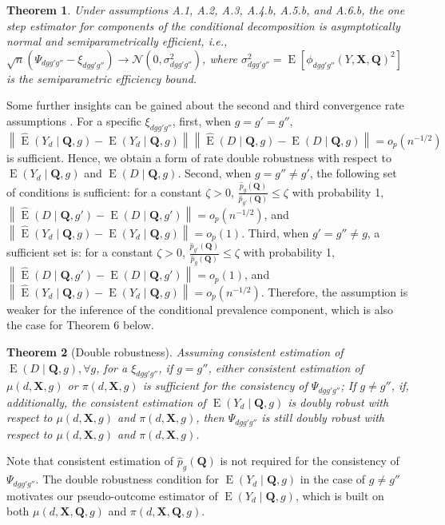 \documentclass[12pt,a4paper]{article}
\newtheorem{prop}{Theorem}
\newcommand{\E}{\operatorname{E}}
\def\X{{\boldsymbol X}}
\def\Q{{\boldsymbol Q}}
\begin{document}
\begin{prop}
Under assumptions A.1, A.2, A.3, A.4.b, A.5.b, and A.6.b, the one step estimator for components of the conditional decomposition is asymptotically normal and semiparametrically efficient, i.e., $\sqrt{n} \left( \Psi_{dgg'g''} - \xi_{dgg'g''} \right) \xrightarrow{} \mathcal{N}(0, \sigma^2_{dgg'g''})$, where $\sigma^2_{dgg'g''}=\E[\phi_{dgg'g''}(Y,\X,\Q)^2]$ is the semiparametric efficiency bound.
\end{prop}
Some further insights can be gained about the second and third convergence rate assumptions . For a specific $\xi_{dgg'g''}$, first, when $g=g'=g''$, $\left\| \hat{\E}\left( Y_d \mid \Q, g \right) - \E(Y_d \mid \Q,g)  \right\| \left\| \hat{\E}(D \mid \Q, g) - \E(D \mid \Q, g)  \right\| = o_p(n^{-1/2})$ is sufficient. Hence, we obtain a form of rate double robustness with respect to $\E(Y_d \mid \Q,g)$ and $\E(D \mid \Q, g)$. Second, when $g= g'' \neq g'$, the following set of conditions is sufficient: for a constant $\zeta>0$, $\frac{\hat{p}_g(\Q)}{\hat{p}_{g'}(\Q)} \leq \zeta$ with probability 1, $\left\| \hat{\E}(D \mid \Q, g') - \E(D \mid \Q, g') \right\|=o_p(n^{-1/2})$, and $ \left\| \hat{\E}\left( Y_d \mid \Q, g \right) - \E(Y_d \mid \Q,g) \right\|=o_p(1)$. Third, when $g'=g'' \neq g$, a sufficient set is: for a constant $\zeta>0$, $ \frac{\hat{p}_{g'}(\Q)}{\hat{p}_{g}(\Q)} \leq \zeta$ with probability 1, $\left\| \hat{\E}(D \mid \Q, g') - \E(D \mid \Q, g') \right\|=o_p(1)$, and $\left\| \hat{\E}\left( Y_d \mid \Q, g \right) - \E(Y_d \mid \Q,g)  \right\|=o_p(n^{-1/2})$. Therefore, the assumption is weaker for the inference of the conditional prevalence component, which is also the case for Theorem 6 below.

\begin{prop}[Double robustness]
Assuming consistent estimation of $\E(D \mid \Q, g), \forall g$, for a $\xi_{dgg'g''}$, if $g=g''$, either consistent estimation of $\mu(d,\X,g)$ or $\pi(d,\X,g)$ is sufficient for the consistency of $\Psi_{dgg'g''}$; If $g \neq g''$, if, additionally, the consistent estimation of $\E(Y_d \mid \Q,g)$ is doubly robust with respect to $\mu(d,\X,g)$ and $\pi(d,\X,g)$, then $\Psi_{dgg'g''}$ is still doubly robust with respect to $\mu(d,\X,g)$ and $\pi(d,\X,g)$.
\end{prop}
Note that consistent estimation of $\hat{p}_g(\Q)$ is not required for the consistency of $\Psi_{dgg'g''}$. The double robustness condition for $\E(Y_d \mid \Q,g)$ in the case of $g \neq g''$ motivates our pseudo-outcome estimator of $\E(Y_d \mid \Q,g)$, which is built on both $\mu(d,\X,\Q,g)$ and $\pi(d,\X,\Q,g)$.
\end{document}

